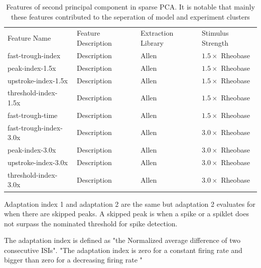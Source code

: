 \begin{table}
\begin{tabular}{llll}
\toprule
Feature Name & Feature Description & Extraction Library  & Stimulus Strength \\
fast-trough-index & Description & Allen & $1.5 \times$ Rheobase\\
peak-index-1.5x & Description & Allen & $1.5 \times$ Rheobase \\
upstroke-index-1.5x & Description & Allen & $1.5 \times$ Rheobase \\
threshold-index-1.5x & Description & Allen & $1.5 \times$ Rheobase \\ 
fast-trough-time & Description & Allen & $1.5 \times$ Rheobase \\
fast-trough-index-3.0x & Description & Allen & $3.0 \times$ Rheobase \\ 
peak-index-3.0x & Description & Allen & $3.0 \times$ Rheobase \\
upstroke-index-3.0x & Description & Allen & $3.0 \times$ Rheobase \\ 
threshold-index-3.0x & Description & Allen & $3.0 \times$ Rheobase \\
\bottomrule
\end{tabular}
\caption[Features of second principal component in sparse PCA]{Features of second principal component in sparse PCA. It is notable that mainly these features contributed to the seperation of model and experiment clusters}
\end{table}

Adaptation index 1 and adaptation 2 are the same but adaptation 2 evaluates for when there are skipped peaks. A skipped peak is when a spike or a spiklet does not surpass the nominated threshold for spike detection. 


The adaptation index is defined as "the Normalized average difference of two consecutive ISIs". "The adaptation index is zero for a constant firing rate and bigger than zero for a decreasing firing rate \citep{EFEL}"

  

